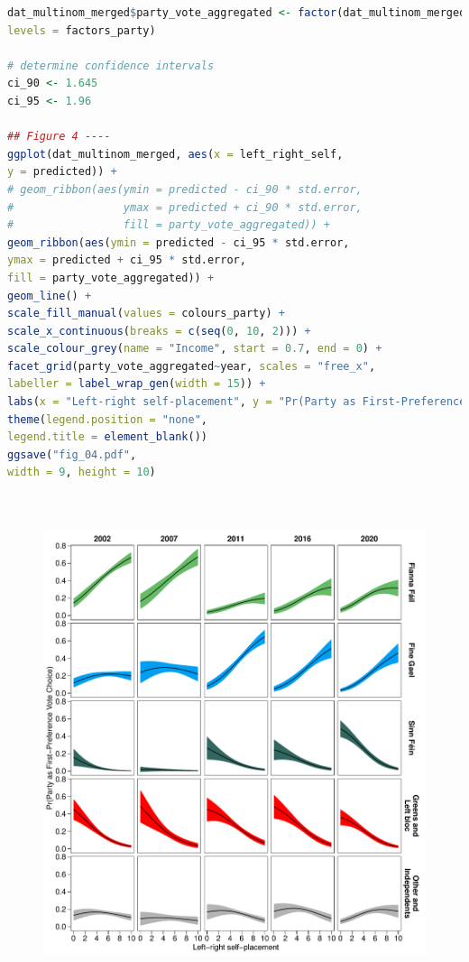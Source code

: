 \documentclass[12pt,letterpaper]{article}
\begin{document}
\begin{lstlisting}[language=R]
dat_multinom_merged$party_vote_aggregated <- factor(dat_multinom_merged$party_vote_aggregated,
levels = factors_party)

# determine confidence intervals
ci_90 <- 1.645
ci_95 <- 1.96

## Figure 4 ----
ggplot(dat_multinom_merged, aes(x = left_right_self, 
y = predicted)) +
# geom_ribbon(aes(ymin = predicted - ci_90 * std.error,
#                 ymax = predicted + ci_90 * std.error,
#                 fill = party_vote_aggregated)) +
geom_ribbon(aes(ymin = predicted - ci_95 * std.error,
ymax = predicted + ci_95 * std.error,
fill = party_vote_aggregated)) +
geom_line() +
scale_fill_manual(values = colours_party) +
scale_x_continuous(breaks = c(seq(0, 10, 2))) +
scale_colour_grey(name = "Income", start = 0.7, end = 0) +
facet_grid(party_vote_aggregated~year, scales = "free_x", 
labeller = label_wrap_gen(width = 15)) +
labs(x = "Left-right self-placement", y = "Pr(Party as First-Preference Vote Choice)") +
theme(legend.position = "none", 
legend.title = element_blank())
ggsave("fig_04.pdf", 
width = 9, height = 10)

	
\end{lstlisting}

\begin{figure}
	\centering
	\includegraphics[width=0.9\linewidth]{fig_04}
\end{figure}
\end{document}
